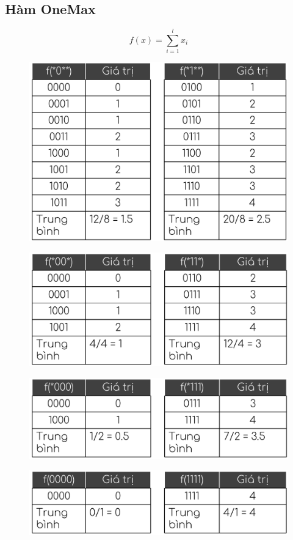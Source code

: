 \documentclass{book}
\begin{document}
        \subsection{Hàm OneMax}
        
        \[
        f(x) = \sum_{i=1}^{l} x_i
        \]
        \begin{figure}[H]
            \centering
            \includegraphics[width=0.6\linewidth]{images/onemaxt1.png}
            \label{fig:onemaxt1}
        \end{figure}
        \begin{figure}[H]
            \centering
            \includegraphics[width=0.6\linewidth]{images/onemaxt2.png}
            \label{fig:onemaxt2}
        \end{figure}
        \begin{figure}[H]
            \centering
            \includegraphics[width=0.6\linewidth]{images/onemaxt3.png}
            \label{fig:onemaxt3}
        \end{figure}
        \begin{figure}[H]
            \centering
            \includegraphics[width=0.6\linewidth]{images/onemaxt4.png}
            \label{fig:onemaxt4}
        \end{figure}
        
\end{document}
